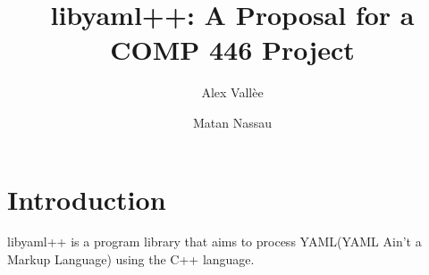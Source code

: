 \documentclass{article}
\author{Alex Vall\`ee \and Matan Nassau}
\title{libyaml++:  A Proposal for a COMP 446 Project}
\begin{document}
\maketitle
\section{Introduction}
libyaml++ is a program library that aims to process YAML(YAML Ain't a Markup
Language) using the C++ language.
\end{document}
